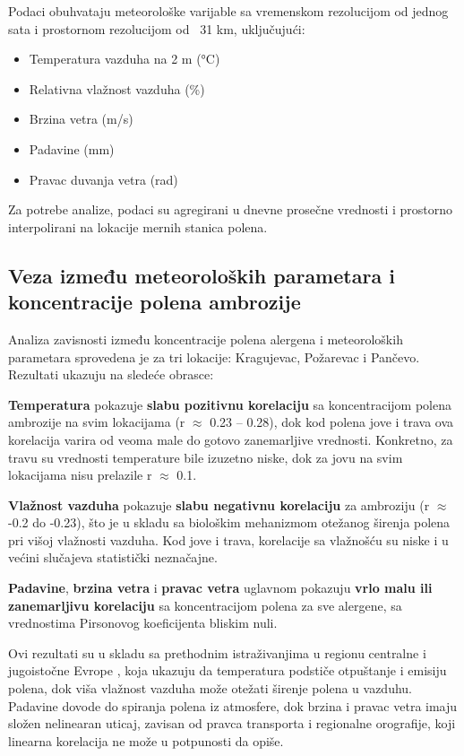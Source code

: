 \documentclass[12pt]{article}
\begin{document}
Podaci obuhvataju meteorološke varijable sa vremenskom rezolucijom od jednog sata i prostornom rezolucijom od ~31 km, uključujući:

\begin{itemize}
    \item Temperatura vazduha na 2 m (°C)
    \item Relativna vlažnost vazduha (\%)
    \item Brzina vetra (m/s)
    \item Padavine (mm)
    \item Pravac duvanja vetra (rad)
\end{itemize}

Za potrebe analize, podaci su agregirani u dnevne prosečne vrednosti i prostorno interpolirani na lokacije mernih stanica polena.

\subsection{Veza između meteoroloških parametara i koncentracije polena ambrozije}


Analiza zavisnosti između koncentracije polena alergena i meteoroloških parametara sprovedena je za tri lokacije: Kragujevac, Požarevac i Pančevo. Rezultati ukazuju na sledeće obrasce:

\textbf{Temperatura} pokazuje \textbf{slabu pozitivnu korelaciju} sa koncentracijom polena ambrozije na svim lokacijama (r $\approx$ 0.23 – 0.28), dok kod polena jove i trava ova korelacija varira od veoma male do gotovo zanemarljive vrednosti. Konkretno, za travu su vrednosti temperature bile izuzetno niske, dok za jovu na svim lokacijama nisu prelazile r $\approx$ 0.1.

\textbf{Vlažnost vazduha} pokazuje \textbf{slabu negativnu korelaciju} za ambroziju (r $\approx$ -0.2 do -0.23), što je u skladu sa biološkim mehanizmom otežanog širenja polena pri višoj vlažnosti vazduha. Kod jove i trava, korelacije sa vlažnošću su niske i u većini slučajeva statistički neznačajne.

\textbf{Padavine}, \textbf{brzina vetra} i \textbf{pravac vetra} uglavnom pokazuju \textbf{vrlo malu ili zanemarljivu korelaciju} sa koncentracijom polena za sve alergene, sa vrednostima Pirsonovog koeficijenta bliskim nuli.

Ovi rezultati su u skladu sa prethodnim istraživanjima u regionu centralne i jugoistočne Evrope \cite{sofiev2006towards,grewling2016combining,sikoparija2017pannonian}, 
koja ukazuju da temperatura podstiče otpuštanje i emisiju polena, dok viša vlažnost vazduha može otežati širenje polena u vazduhu. Padavine dovode do spiranja polena iz atmosfere, dok brzina i pravac vetra imaju složen nelinearan uticaj, zavisan od pravca transporta i regionalne orografije, koji linearna korelacija ne može u potpunosti da opiše.
\end{document}
